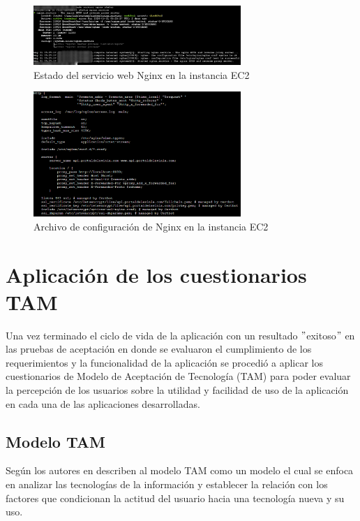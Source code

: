 \begin{figure}[H]
    \centering
    \includegraphics[width=0.7\textwidth]{resources/images/aws-nginx}
    \caption{Estado del servicio web Nginx en la instancia EC2}
    \label{fig:nginx}
\end{figure}

\begin{figure}[H]
    \centering
    \includegraphics[width=0.7\textwidth]{resources/images/aws-nginx-config}
    \caption{Archivo de configuración de Nginx en la instancia EC2}
    \label{fig:nginx-config}
\end{figure}

\section{Aplicación de los cuestionarios TAM}\label{sec:aplicacion-de-los-cuestionarios-tam}

Una vez terminado el ciclo de vida de la aplicación con un resultado \("\)exitoso\("\) en las pruebas de aceptación en donde se evaluaron el cumplimiento de los requerimientos y la funcionalidad de la aplicación se procedió a aplicar los cuestionarios de Modelo de Aceptación de Tecnología (TAM) para poder evaluar la percepción de los usuarios sobre la utilidad y facilidad de uso de la aplicación en cada una de las aplicaciones desarrolladas.
\subsection{Modelo TAM}\label{subsec:modelo-tam}

Según los autores en \cite{tapia_leon_comparacion_2015} describen al modelo TAM como un modelo el cual se enfoca en analizar las tecnologías de la información y establecer la relación con los factores que condicionan la actitud del usuario hacia una tecnología nueva y su uso.

